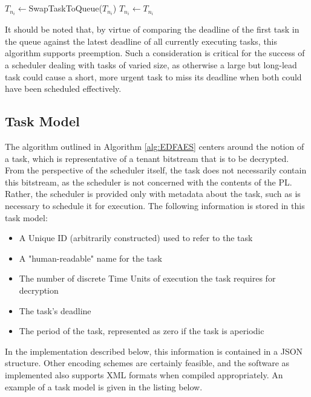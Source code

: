 \begin{algorithm}
\begin{algorithmic}
                    \\
                    \State {}
                    \\

                        \State $T_{n_i} \gets $SwapTaskToQueue($T_{n_i}$)
                    \Else
                        \State $T_{n_i} \gets T_{n_i}$
                    \EndIf
                \EndIf
            \EndFor
        \EndWhile
    \end{algorithmic}
\end{algorithm}

It should be noted that, by virtue of comparing the deadline of the first task in the queue against the latest deadline of all currently executing tasks, this algorithm supports preemption. Such a consideration is critical for the success of a scheduler dealing with tasks of varied size, as otherwise a large but long-lead task could cause a short, more urgent task to miss its deadline when both could have been scheduled effectively.

\subsection{Task Model}\label{subsec:TaskModel}
The algorithm outlined in Algorithm \ref{alg:EDFAES} centers around the notion of a task, which is representative of a tenant bitstream that is to be decrypted. From the perspective of the scheduler itself, the task does not necessarily contain this bitstream, as the scheduler is not concerned with the contents of the PL. Rather, the scheduler is provided only with metadata about the task, such as is necessary to schedule it for execution. The following information is stored in this task model:

\begin{itemize}
    \item A Unique ID (arbitrarily constructed) used to refer to the task
    \item A "human-readable" name for the task
    \item The number of discrete Time Units of execution the task requires for decryption
    \item The task's deadline
    \item The period of the task, represented as zero if the task is aperiodic
\end{itemize}
In the implementation described below, this information is contained in a JSON structure. Other encoding schemes are certainly feasible, and the software as implemented also supports XML formats when compiled appropriately. An example of a task model is given in the listing below.

